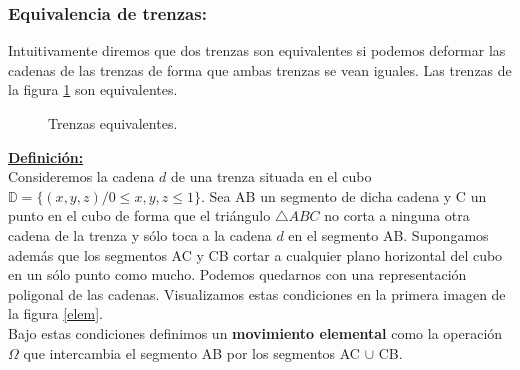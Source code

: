 \documentclass[14pt]{extarticle}
\begin{document}
\bigskip
\begin{center}
	\subsubsection{Equivalencia de trenzas:}
\end{center}
Intuitivamente diremos que dos trenzas son equivalentes si podemos deformar las cadenas de las trenzas de forma que ambas trenzas se vean iguales. Las trenzas de la figura \ref{tren3} son equivalentes.\\
\begin{figure}[h!]
	\centering
	\space
	\caption{Trenzas equivalentes.}
	\label{tren3} 
\end{figure}

\textbf{\underline{Definición:}}\\
Consideremos la cadena $d$ de una trenza situada en el cubo $\mathds{D} = \{(x,y,z) / 0 \leq x,y,z \leq 1\}$. Sea AB un segmento de dicha cadena y C un punto en el cubo de forma que el triángulo $\triangle ABC$ no corta a ninguna otra cadena de la trenza y sólo toca a la cadena $d$ en el segmento AB. Supongamos además que los segmentos AC y CB cortar a cualquier plano horizontal del cubo en un sólo punto como mucho. Podemos quedarnos con una representación poligonal de las cadenas. Visualizamos estas condiciones en la primera imagen de la figura \ref{elem}.\\
Bajo estas condiciones definimos un \textbf{movimiento elemental} como la operación $ \Omega $ que intercambia el segmento AB por los segmentos AC $ \cup $ CB.\\
\end{document}
